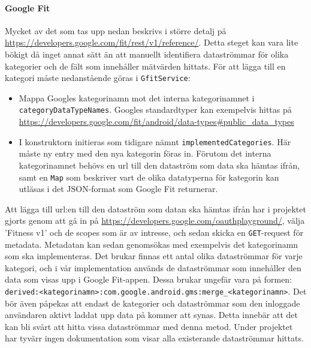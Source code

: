 \documentclass[techdoc/techdoc.tex]{subfiles}
\begin{document}
\paragraph{Google Fit}
Mycket av det som tas upp nedan beskrivs i större detalj på
\url{https://developers.google.com/fit/rest/v1/reference/}.
Detta steget kan vara lite bökigt då inget annat sätt än att manuellt
identifiera dataströmmar för olika kategorier och de fält som innehåller
mätvärden hittats.  För att lägga till en kategori måste nedanstående göras i
\texttt{GfitService}:
\begin{itemize}
    \item Mappa Googles kategorinamn mot det interna kategorinamnet i
        \texttt{categoryDataTypeNames}. Googles standardtyper kan exempelvis
        hittas på
  \url{https://developers.google.com/fit/android/data-types#public_data_types}
    \item I konstruktorn initieras som tidigare nämnt
        \texttt{implementedCategories}. Här måste ny entry med den nya
        kategorin föras in. Förutom det interna kategorinamnet behövs en url
        till den dataström som data ska hämtas ifrån, samt en \texttt{Map} som
        beskriver vart de olika datatyperna för kategorin kan utläsas i det
        JSON-format som Google Fit returnerar.
\end{itemize}

Att lägga till url:en till den dataström som datan ska hämtas ifrån har i
projektet gjorts genom att gå in på
\url{https://developers.google.com/oauthplayground/}, välja 'Fitness v1' och de
scopes som är av intresse, och sedan skicka en \texttt{GET}-request för
metadata. Metadatan kan sedan genomsökas med exempelvis det kategorinamn som
ska implementeras. Det brukar finnas ett antal olika dataströmmar för varje
kategori, och i vår implementation används de dataströmmar som innehåller den
data som visas upp i Google Fit-appen. Dessa brukar ungefär vara på formen: \\
\texttt{derived:<kategorinamn>:com.google.android.gms:merge\_<kategorinamn>}.
Det bör även påpekas att endast de kategorier och dataströmmar som den
inloggade användaren aktivt laddat upp data på kommer att synas. Detta innebär
att det kan bli svårt att hitta vissa dataströmmar med denna metod. Under
projektet har tyvärr ingen dokumentation som visar alla existerande
dataströmmar hittats.
\end{document}
